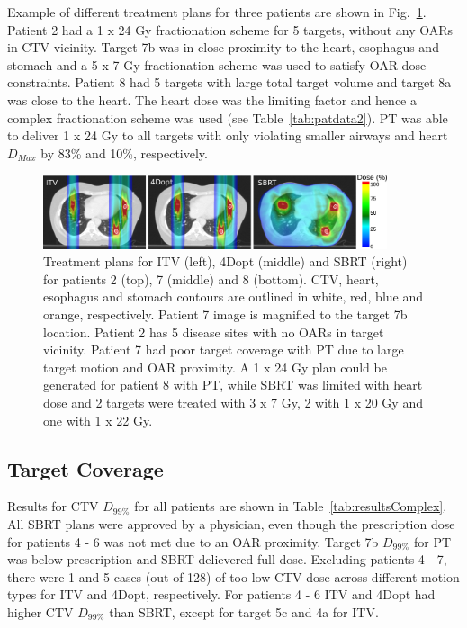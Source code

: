 \documentclass[type=dr, dr=rernat, accentcolor=tud7b,colorbacktitle, bigchapter, openright, twoside, 12pt ]{tudthesis}
\begin{document}
Example of different treatment plans for three patients are shown in Fig.~\ref{Fig:multiExample}. Patient 2 had a 1 x 24 Gy fractionation scheme for 5 targets, without any OARs in CTV vicinity.
Target 7b was in close proximity to the heart, esophagus and stomach and a 5 x 7 Gy fractionation scheme was used to satisfy OAR dose constraints. 
Patient 8 had 5 targets with large total target
volume and target 8a was close to the heart. The heart dose was the limiting factor and hence a complex fractionation scheme was used (see Table~\ref{tab:patdata2}). 
PT was able to deliver 1 x 24 Gy to all targets with only
violating smaller airways and heart $D_{Max}$ by 83\% and 10\%, respectively.

\newpage
\begin{figure}[H]
	\begin{center}
		\includegraphics[width=0.9\textwidth]{./Images/multiExample.png}
		\caption{Treatment plans for ITV (left), 4Dopt (middle) and SBRT (right) for patients 2 (top), 7 (middle) and 8 (bottom). 
		CTV, heart, esophagus and stomach contours are outlined in white, red, blue and orange,
		respectively. Patient 7 image is magnified to the target 7b location. Patient 2 has 5 disease sites with no OARs in target vicinity. Patient 7 had poor target coverage
		with PT due to large target motion and OAR proximity. A 1 x 24 Gy plan could be generated for patient 8 with PT, 
		while SBRT was limited with heart dose and 2 targets were treated with 3 x 7 Gy, 2 with 1 x 20 Gy and one with 1 x 22 Gy. }
		\label{Fig:multiExample}
	\end{center}
\end{figure}
\newpage
\subsection{Target Coverage}

Results for CTV $D_{99\%}$ for all patients are shown in Table~\ref{tab:resultsComplex}. All SBRT plans were approved by a physician, 
even though the prescription dose for patients 4 - 6 was not met due to an OAR proximity. Target 7b $D_{99\%}$ for PT was below prescription and SBRT delievered full dose.
Excluding patients 4 - 7, there were 1 and 5 cases (out of 128) of too low CTV dose across different
motion types for ITV and 4Dopt, respectively. For patients 4 - 6 ITV and 4Dopt had higher CTV $D_{99\%}$ than SBRT, except for target 5c and 4a for ITV.
\end{document}
